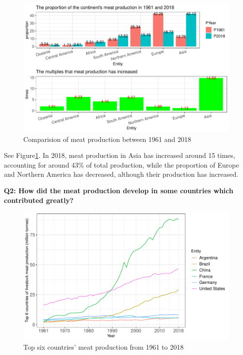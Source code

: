 \documentclass[11pt,a4paper,]{article}
\begin{document}
\begin{figure}
\centering
\includegraphics{report_files/figure-latex/continent-increase-1.pdf}
\caption{\label{fig:continent-increase}Comparision of meat production between 1961 and 2018}
\end{figure}

See Figure\ref{fig:continent-increase}. In 2018, meat production in Asia has increased around 15 times, accounting for around 43\% of total production, while the proportion of Europe and Northern America has decreased, although their production has increased.

\clearpage

\textbf{Q2: How did the meat production develop in some countries which contributed greatly?}

\begin{figure}
\centering
\includegraphics{report_files/figure-latex/country-1.pdf}
\caption{\label{fig:country}Top six countries' meat production from 1961 to 2018}
\end{figure}
\end{document}
